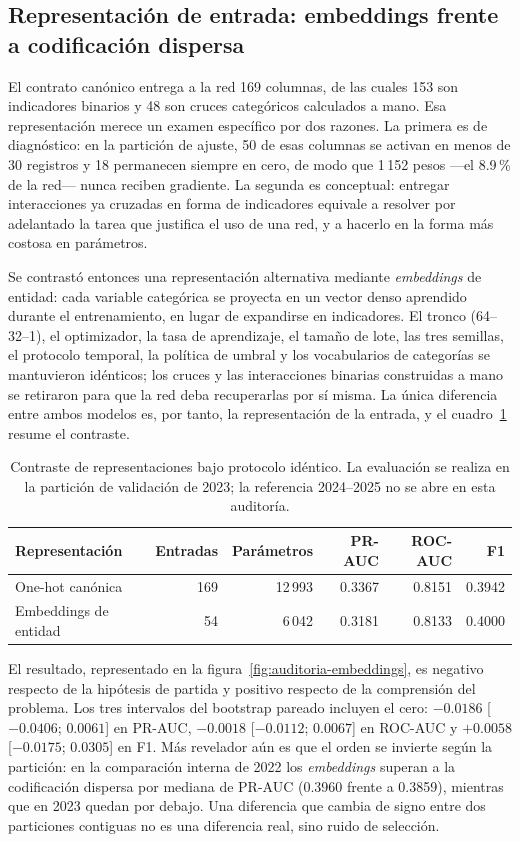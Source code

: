 \subsection{Representación de entrada: embeddings frente a codificación dispersa}\label{sec:embeddings}
El contrato canónico entrega a la red 169 columnas, de las cuales 153 son indicadores binarios y 48 son cruces categóricos calculados a mano. Esa representación merece un examen específico por dos razones. La primera es de diagnóstico: en la partición de ajuste, 50 de esas columnas se activan en menos de 30 registros y 18 permanecen siempre en cero, de modo que 1\,152 pesos ---el 8.9\,\% de la red--- nunca reciben gradiente. La segunda es conceptual: entregar interacciones ya cruzadas en forma de indicadores equivale a resolver por adelantado la tarea que justifica el uso de una red, y a hacerlo en la forma más costosa en parámetros.

Se contrastó entonces una representación alternativa mediante \emph{embeddings} de entidad: cada variable categórica se proyecta en un vector denso aprendido durante el entrenamiento, en lugar de expandirse en indicadores. El tronco (64--32--1), el optimizador, la tasa de aprendizaje, el tamaño de lote, las tres semillas, el protocolo temporal, la política de umbral y los vocabularios de categorías se mantuvieron idénticos; los cruces y las interacciones binarias construidas a mano se retiraron para que la red deba recuperarlas por sí misma. La única diferencia entre ambos modelos es, por tanto, la representación de la entrada, y el cuadro~\ref{tab:embeddings} resume el contraste.

\begin{table}[tbp]\centering\small
\caption{Contraste de representaciones bajo protocolo idéntico. La evaluación se realiza en la partición de validación de 2023; la referencia 2024--2025 no se abre en esta auditoría.}
\label{tab:embeddings}
\begin{tabular}{lrrrrr}\toprule
Representación & Entradas & Parámetros & PR-AUC & ROC-AUC & F1 \\\midrule
One-hot canónica & 169 & 12\,993 & 0.3367 & 0.8151 & 0.3942 \\
Embeddings de entidad & 54 & 6\,042 & 0.3181 & 0.8133 & 0.4000 \\\bottomrule
\end{tabular}
\end{table}

El resultado, representado en la figura~\ref{fig:auditoria-embeddings}, es negativo respecto de la hipótesis de partida y positivo respecto de la comprensión del problema. Los tres intervalos del bootstrap pareado incluyen el cero: $-0.0186$ [$-0.0406$; $0.0061$] en PR-AUC, $-0.0018$ [$-0.0112$; $0.0067$] en ROC-AUC y $+0.0058$ [$-0.0175$; $0.0305$] en F1. Más revelador aún es que el orden se invierte según la partición: en la comparación interna de 2022 los \emph{embeddings} superan a la codificación dispersa por mediana de PR-AUC (0.3960 frente a 0.3859), mientras que en 2023 quedan por debajo. Una diferencia que cambia de signo entre dos particiones contiguas no es una diferencia real, sino ruido de selección.

